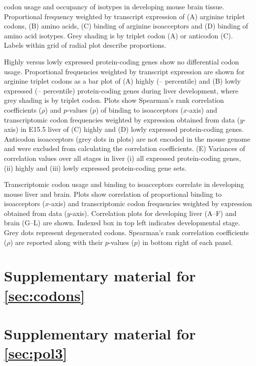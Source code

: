     {\mrna codon usage and  occupancy of \trna isotypes in developing mouse
    brain tissue.}
    {Proportional frequency weighted by transcript expression of (A) arginine
    triplet codons, (B) amino acids, (C)  binding of arginine isoacceptors
    and (D)  binding of amino acid isotypes. Grey shading is by triplet
    codon (A) or \trna anticodon (C). Labels within grid of radial plot describe
    proportions.}

    {Highly versus lowly expressed protein-coding genes show no differential
    codon usage.}
    {Proportional frequencies weighted by transcript expression are shown for
    arginine triplet codons as a bar plot of (A) highly (–
    percentile) and (B) lowly expressed (– percentile)
    protein-coding genes during liver development, where grey shading is by
    triplet codon. Plots show Spearman’s rank correlation coefficients
    (\(\rho\)) and \(p\)-values (\(p\)) of  binding to \trna isoacceptors
    (\(x\)-axis) and transcriptomic codon frequencies weighted by expression
    obtained from \rnaseq data (\(y\)-axis) in E15.5 liver of (C) highly and (D)
    lowly expressed protein-coding genes. Anticodon isoacceptors (grey dots in
    plots) are not encoded in the mouse genome and were excluded from
    calculating the correlation coefficients. (E) Variances of correlation
    values over all stages in liver (i) all expressed protein-coding genes, (ii)
    highly and (iii) lowly expressed protein-coding gene sets.}

    {Transcriptomic \mrna codon usage and  binding to \trna isoacceptors
    correlate in developing mouse liver and brain.}
    {Plots show correlation of proportional  binding to \trna isoacceptors
    (\(x\)-axis) and transcriptomic codon frequencies weighted by expression
    obtained from \rnaseq data (\(y\)-axis). Correlation plots for developing
    liver (A–F) and brain (G–L) are shown. Indexed box in top left indicates
    developmental stage. Grey dots represent degenerated codons. Spearman’s rank
    correlation coefficients (\(ρ\)) are reported along with their \(p\)-values
    (\(p\)) in bottom right of each panel.}

\chapter{Supplementary material for \texorpdfstring{\cref*{sec:codons}}{chapter 3}}

\chapter{Supplementary material for \texorpdfstring{\cref*{sec:pol3}}{chapter 4}}

\endgroup
